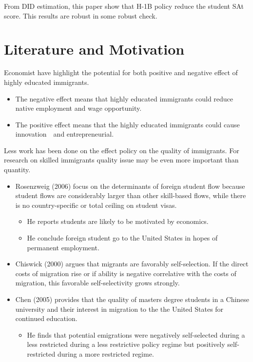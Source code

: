 \documentclass[../root]{subfiles}
\begin{document}
   From DID estimation, this paper show that H-1B policy reduce the student SAt score. This results are robust in some robust check. 
   
   
    \section{Literature and Motivation}
    
    Economist have highlight the potential for both positive and negative effect of highly educated immigrants.
    
    \begin{itemize}
        \item The negative effect means that highly educated immigrants could reduce native employment and wage opportunity.
        \item The positive effect means that the highly educated immigrants could cause innovation　and entrepreneurial.
    \end{itemize}
     
     Less work has been done on the effect policy on the quality of immigrants.
     For research on skilled immigrants quality issue may be even more important than quantity.
     
     \begin{itemize}
         \item  Rosenzweig (2006) focus on the determinants of foreign student flow because student flows are considerably larger than other skill-based flows, while there is no country-specific or total ceiling on student visas.
            \begin{itemize}
                \item He reports students are likely to be motivated by economics.
                \item He conclude foreign student go to the United States in hopes of permanent employment.
            \end{itemize}
         \item Chiswick (2000) argues that migrants are favorably self-selection. If the direct costs of migration rise or if ability is negative correlative with the costs of migration, this favorable self-selectivity grows strongly. 
         \item  Chen (2005) provides that the quality of masters degree students in a Chinese university and their interest in migration to the the United States for continued education.  
         \begin{itemize}
             \item He finds that potential emigrations were negatively self-selected during a less restricted during a less restrictive policy regime but positively self-restricted during a more restricted regime.
         \end{itemize}
     \end{itemize}
     
\end{document}
